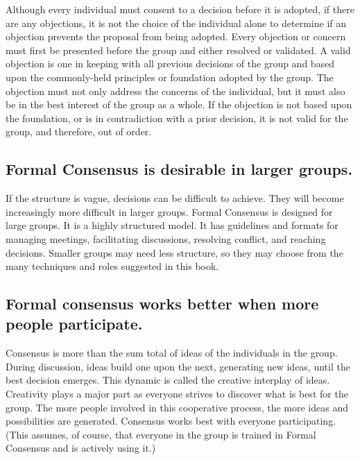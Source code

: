 Although every individual must consent to a decision before it is
adopted, if there are any objections, it is not the choice of the
individual alone to determine if an objection prevents the proposal
from being adopted. Every objection or concern must first be
presented before the group and either resolved or validated. A
valid objection is one in keeping with all previous decisions of
the group and based upon the commonly-held principles or foundation
adopted by the group. The objection must not only address the
concerns of the individual, but it must also be in the best
interest of the group as a whole. If the objection is not based
upon the foundation, or is in contradiction with a prior decision,
it is not valid for the group, and therefore, out of order.

\subsection*{Formal Consensus is desirable in larger groups.}

If the structure is vague, decisions can be difficult to
achieve. They will become increasingly more difficult in larger
groups. Formal Consensus is designed for large groups. It is a
highly structured model. It has guidelines and formats for managing
meetings, facilitating discussions, resolving conflict, and
reaching decisions. Smaller groups may need less structure, so
they may choose from the many techniques and roles suggested in
this book.

\subsection*{Formal consensus works better when more people participate.}
Consensus is more than the sum total of ideas of the individuals
in the group. During discussion, ideas build one upon the next,
generating new ideas, until the best decision emerges. This
dynamic is called the creative interplay of ideas. Creativity plays
a major part as everyone strives to discover what is best for the
group. The more people involved in this cooperative process, the
more ideas and possibilities are generated. Consensus works best
with everyone participating. (This assumes, of course, that
everyone in the group is trained in Formal Consensus and is
actively using it.)

